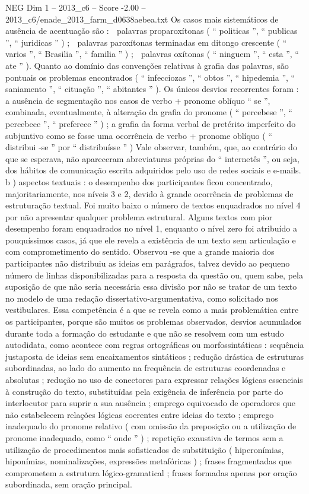 \begin{textsample}{NEG Dim 1 – 2013\_c6 – Score -2.00 – 2013\_c6/enade\_2013\_farm\_d0638aebea.txt}
Os casos mais sistemáticos de ausência de acentuação são :  palavras proparoxítonas ( “ politicas ”, “ publicas ”, “ juridicas ” ) ;  palavras paroxítonas terminadas em ditongo crescente ( “ varios ”, “ Brasilia ”, “ familia ” ) ;  palavras oxítonas ( “ ninguem ”, “ esta ”, “ ate ” ).
Quanto ao domínio das convenções relativas à grafia das palavras, são pontuais os problemas encontrados ( “ infecciozas ”, “ obtos ”, “ hipedemia ”, “ saniamento ”, “ cituação ”, “ abitantes ” ).
Os únicos desvios recorrentes foram : a ausência de segmentação nos casos de verbo + pronome oblíquo “ se ”, combinada, eventualmente, à alteração da grafia do pronome ( “ percebese ”, “ percebece ”, “ preferece ” ) ; a grafia da forma verbal de pretérito imperfeito do subjuntivo como se fosse uma ocorrência de verbo + pronome oblíquo ( “ distribui -se ” por “ distribuísse ” ) Vale observar, também, que, ao contrário do que se esperava, não apareceram abreviaturas próprias do “ internetês ”, ou seja, dos hábitos de comunicação escrita adquiridos pelo uso de redes sociais e e-mails. b ) aspectos textuais : o desempenho dos participantes ficou concentrado, majoritariamente, nos níveis 3 e 2, devido à grande ocorrência de problemas de estruturação textual.
Foi muito baixo o número de textos enquadrados no nível 4 por não apresentar qualquer problema estrutural.
Alguns textos com pior desempenho foram enquadrados no nível 1, enquanto o nível zero foi atribuído a pouquíssimos casos, já que ele revela a existência de um texto sem articulação e com comprometimento do sentido.
Observou -se que a grande maioria dos participantes não distribuiu as ideias em parágrafos, talvez devido ao pequeno número de linhas disponibilizadas para a resposta da questão ou, quem sabe, pela suposição de que não seria necessária essa divisão por não se tratar de um texto no modelo de uma redação dissertativo-argumentativa, como solicitado nos vestibulares.
Essa competência é a que se revela como a mais problemática entre os participantes, porque são muitos os problemas observados, desvios acumulados durante toda a formação do estudante e que não se resolvem com um estudo autodidata, como acontece com regras ortográficas ou morfossintáticas : sequência justaposta de ideias sem encaixamentos sintáticos ; redução drástica de estruturas subordinadas, ao lado do aumento na frequência de estruturas coordenadas e absolutas ; redução no uso de conectores para expressar relações lógicas essenciais à construção do texto, substituídas pela exigência de inferência por parte do interlocutor para suprir a sua ausência ; emprego equivocado de operadores que não estabelecem relações lógicas coerentes entre ideias do texto ; emprego inadequado do pronome relativo ( com omissão da preposição ou a utilização de pronome inadequado, como “ onde ” ) ; repetição exaustiva de termos sem a utilização de procedimentos mais sofisticados de substituição ( hiperonímias, hiponímias, nominalizações, expressões metafóricas ) ; frases fragmentadas que comprometem a estrutura lógico-gramatical ; frases formadas apenas por oração subordinada, sem oração principal.

\end{textsample}
